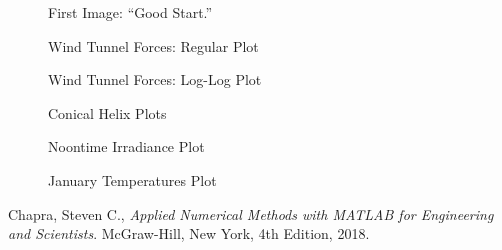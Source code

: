 \documentclass{article}
\begin{document}
\begin{figure}[ht!]
\begin{center}
\caption{First Image: ``Good Start.''}
\end{center}
\end{figure}

\clearpage

\begin{figure}[ht!]
\begin{center}
\caption{Wind Tunnel Forces: Regular Plot}
\end{center}
\end{figure}

\begin{figure}[ht!]
\begin{center}
\caption{Wind Tunnel Forces: Log-Log Plot}
\end{center}
\end{figure}

\begin{figure}[ht!]
\begin{center}
\caption{Conical Helix Plots}
\end{center}
\end{figure}
\clearpage

\begin{figure}[ht!]
\begin{center}
\caption{Noontime Irradiance Plot}
\end{center}
\end{figure}

\begin{figure}[ht!]
\begin{center}
\caption{January Temperatures Plot}
\end{center}
\end{figure}
\clearpage

\begin{thebibliography}{9}
  Chapra, Steven C.,
  {\it Applied Numerical Methods with MATLAB for Engineering and Scientists}.
  McGraw-Hill, New York,
  4th Edition,
  2018.
\end{thebibliography}
\end{document}
